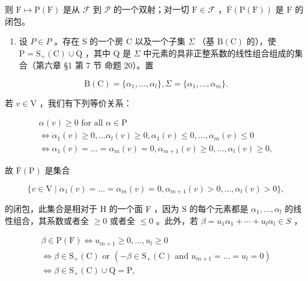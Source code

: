 则 \(\mathrm{F} \mapsto \mathrm{P}(\mathrm{F})\) 是从 \(\mathcal{F}\) 到 \(\mathcal{P}\) 的一个双射；对一切 \(\mathrm{F} \in \mathcal{F}\) ，\(\overline{\mathrm{F}}(\mathrm{P}(\mathrm{F}))\) 是 \(\mathrm{F}\) 的闭包。

\begin{enumerate}
\def\labelenumi{\alph{enumi})}
\tightlist
\item
  设 \(P \in P\) 。存在 S 的一个房 C 以及一个子集 \(\Sigma\) （基 \(\mathrm{B}(\mathrm{C})\) 的），使 \(\mathrm{P} = \mathrm{S}_{+}(\mathrm{C}) \cup \mathrm{Q}\) ，其中 Q 是 \(\Sigma\) 中元素的具非正整系数的线性组合组成的集合（第六章 §1 第 7 节 命题 20）。置
\end{enumerate}

\[
\mathrm{B} (\mathrm{C}) = \{\alpha_ {1}, \dots , \alpha_ {l} \}, \Sigma = \{\alpha_ {1}, \dots , \alpha_ {m} \}.
\]

若 \(v \in \mathrm{V}\) ，我们有下列等价关系：

\[
\begin{array}{c} \alpha (v) \geq 0 \text {   for   all   } \alpha \in \mathrm{P} \\ \Longleftrightarrow \alpha_ {1} (v) \geq 0, \ldots \alpha_ {l} (v) \geq 0, \alpha_ {1} (v) \leq 0, \ldots , \alpha_ {m} (v) \leq 0 \\ \Longleftrightarrow \alpha_ {1} (v) = \dots = \alpha_ {m} (v) = 0, \alpha_ {m + 1} (v) \geq 0, \ldots , \alpha_ {l} (v) \geq 0, \end{array}
\]

故 \(\overline{\mathrm{F}}(\mathrm{P})\) 是集合

\[
\{v \in \mathrm{V} \mid \alpha_ {1} (v) = \dots = \alpha_ {m} (v) = 0, \alpha_ {m + 1} (v) > 0, \dots , \alpha_ {l} (v) > 0 \},
\]

的闭包，此集合是相对于 H 的一个面 F ，因为 S 的每个元素都是 \(\alpha_{1},\ldots,\alpha_{l}\) 的线性组合，其系数或者全 \(\geq0\) 或者全 \(\leq0\) 。此外，若 \(\beta=u_{1}\alpha_{1}+\cdots+u_{l}\alpha_{l}\in S\) ，

\[
\begin{array}{c} \beta \in \mathrm{P} (\mathrm{F}) \Longleftrightarrow u _ {m + 1} \geq 0, \ldots , u _ {l} \geq 0 \\ \Longleftrightarrow \beta \in \mathrm{S} _ {+} (\mathrm{C}) \text {   or   } (- \beta \in \mathrm{S} _ {+} (\mathrm{C}) \text {   and   } u _ {m + 1} = \ldots = u _ {l} = 0) \\ \Longleftrightarrow \beta \in \mathrm{S} _ {+} (\mathrm{C}) \cup \mathrm{Q} = \mathrm{P}, \end{array}
\]

